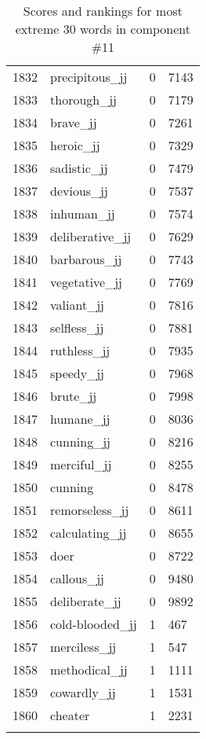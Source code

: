 \begin{longtable}[!htbp]{| rlr@{.}l |}
    1832 & precipitous\_jj & 0 & 7143 \\
    1833 & thorough\_jj & 0 & 7179 \\
    1834 & brave\_jj & 0 & 7261 \\
    1835 & heroic\_jj & 0 & 7329 \\
    1836 & sadistic\_jj & 0 & 7479 \\
    1837 & devious\_jj & 0 & 7537 \\
    1838 & inhuman\_jj & 0 & 7574 \\
    1839 & deliberative\_jj & 0 & 7629 \\
    1840 & barbarous\_jj & 0 & 7743 \\
    1841 & vegetative\_jj & 0 & 7769 \\
    1842 & valiant\_jj & 0 & 7816 \\
    1843 & selfless\_jj & 0 & 7881 \\
    1844 & ruthless\_jj & 0 & 7935 \\
    1845 & speedy\_jj & 0 & 7968 \\
    1846 & brute\_jj & 0 & 7998 \\
    1847 & humane\_jj & 0 & 8036 \\
    1848 & cunning\_jj & 0 & 8216 \\
    1849 & merciful\_jj & 0 & 8255 \\
    1850 & cunning & 0 & 8478 \\
    1851 & remorseless\_jj & 0 & 8611 \\
    1852 & calculating\_jj & 0 & 8655 \\
    1853 & doer & 0 & 8722 \\
    1854 & callous\_jj & 0 & 9480 \\
    1855 & deliberate\_jj & 0 & 9892 \\
    1856 & cold-blooded\_jj & 1 & 467 \\
    1857 & merciless\_jj & 1 & 547 \\
    1858 & methodical\_jj & 1 & 1111 \\
    1859 & cowardly\_jj & 1 & 1531 \\
    1860 & cheater & 1 & 2231 \\
    \hline
    \caption{Scores and rankings for most extreme 30 words in component \#11} \\
\end{longtable}
